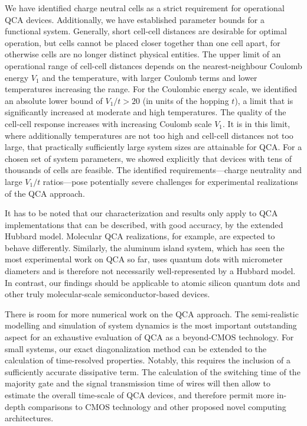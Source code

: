 We have identified charge neutral cells as a strict requirement for operational
QCA devices. Additionally, we have established parameter bounds for a functional
system. Generally, short cell-cell distances are desirable for optimal
operation, but cells cannot be placed closer together than one cell apart, for
otherwise cells are no longer distinct physical entities. The upper limit of an
operational range of cell-cell distances depends on the nearest-neighbour
Coulomb energy $V_1$ and the temperature, with larger Coulomb terms and lower
temperatures increasing the range. For the Coulombic energy scale, we identified
an absolute lower bound of $V_1/t > 20$ (in units of the hopping $t$), a limit
that is significantly increased at moderate and high temperatures. The quality
of the cell-cell response increases with increasing Coulomb scale $V_1$. It is
in this limit, where additionally temperatures are not too high and cell-cell
distances not too large, that practically sufficiently large system sizes are
attainable for QCA. For a chosen set of system parameters, we showed explicitly
that devices with tens of thousands of cells are feasible. The identified
requirements---charge neutrality and large $V_1/t$ ratios---pose potentially
severe challenges for experimental realizations of the QCA approach.

It has to be noted that our characterization and results only apply to QCA
implementations that can be described, with good accuracy, by the extended
Hubbard model. Molecular QCA realizations, for example, are expected to behave
differently. Similarly, the aluminum island system, which has seen the most
experimental work on QCA so far, uses quantum dots with micrometer diameters and
is therefore not necessarily well-represented by a Hubbard model. In contrast,
our findings should be applicable to atomic silicon quantum dots and other truly
molecular-scale semiconductor-based devices.

There is room for more numerical work on the QCA approach. The semi-realistic
modelling and simulation of system dynamics is the most important outstanding
aspect for an exhaustive evaluation of QCA as a beyond-CMOS technology. For
small systems, our exact diagonalization method can be extended to the
calculation of time-resolved properties. Notably, this requires the inclusion of
a sufficiently accurate dissipative term. The calculation of the switching time
of the majority gate and the signal transmission time of wires will then allow
to estimate the overall time-scale of QCA devices, and therefore permit more
in-depth comparisons to CMOS technology and other proposed novel computing
architectures.

